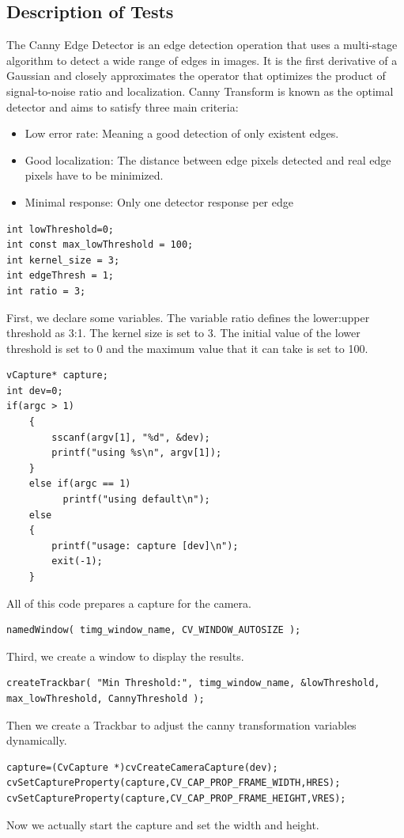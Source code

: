 \documentclass{article}
\begin{document}
\subsection*{Description of Tests}
The Canny Edge Detector is an edge detection operation that uses a multi-stage algorithm to detect a wide range of edges in images. It is the first derivative of a Gaussian and closely approximates the operator that optimizes the product of signal-to-noise ratio and localization. Canny Transform is known as the optimal detector and aims to satisfy three main criteria:
\begin{itemize}
	\item Low error rate: Meaning a good detection of only existent edges. 
	\item  Good localization: The distance between edge pixels detected and real edge pixels have to be minimized. 
	\item  Minimal response: Only one detector response per edge
\end{itemize}
\begin{lstlisting}
int lowThreshold=0; 
int const max_lowThreshold = 100; 
int kernel_size = 3;
int edgeThresh = 1; 
int ratio = 3;
\end{lstlisting}
First, we declare some variables. The variable ratio defines the lower:upper threshold as 3:1. The kernel size is set to  3. The initial value of the lower threshold is set to 0 and the maximum value that it can take is set to 100.
\begin{lstlisting}
vCapture* capture;
int dev=0; 
if(argc > 1)
    {
        sscanf(argv[1], "%d", &dev);
        printf("using %s\n", argv[1]);
    }
    else if(argc == 1)
          printf("using default\n");
    else
    {
        printf("usage: capture [dev]\n");
        exit(-1);
    }
\end{lstlisting}
All of this code prepares a capture for the camera.

\begin{lstlisting}
namedWindow( timg_window_name, CV_WINDOW_AUTOSIZE );
\end{lstlisting}
Third, we create a window to display the results.


\begin{lstlisting}
createTrackbar( "Min Threshold:", timg_window_name, &lowThreshold, max_lowThreshold, CannyThreshold );
\end{lstlisting}
Then we create a Trackbar to adjust the canny transformation variables dynamically.
\begin{lstlisting}
capture=(CvCapture *)cvCreateCameraCapture(dev);
cvSetCaptureProperty(capture,CV_CAP_PROP_FRAME_WIDTH,HRES);
cvSetCaptureProperty(capture,CV_CAP_PROP_FRAME_HEIGHT,VRES);
\end{lstlisting}
Now we actually start the capture and set the width and height.
\end{document}
